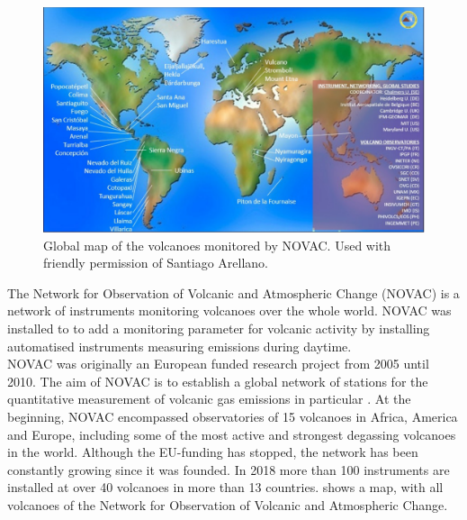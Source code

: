 


		\begin{figure}[h]
			\centering
			\includegraphics[width=0.8\linewidth]{Bilder/NOVAC2015}
			\caption{Global map of the volcanoes monitored by NOVAC. Used with friendly permission of Santiago Arellano.}
			\label{fig:novac2015}
		\end{figure}
		The Network for Observation of Volcanic and Atmospheric Change (NOVAC) is a network of instruments monitoring volcanoes over the whole world. 
		NOVAC was installed to to add a monitoring parameter for volcanic activity by installing automatised instruments measuring  emissions during daytime.\\
		NOVAC was originally an European funded research project from 2005 until 2010. The aim of NOVAC is to  establish  a  global  
		network  of  stations  for  the  quantitative  measurement  of  volcanic gas  emissions in particular . At the beginning, NOVAC encompassed observatories of 15 volcanoes in Africa, America and Europe, including some of the most active and strongest degassing volcanoes in the world. Although the EU-funding has stopped, the network has been constantly growing since it was founded. In 2018 more than 100 instruments are installed at over 40 volcanoes in more than 13 countries.
		 shows a map, with all volcanoes of the Network for Observation of Volcanic and Atmospheric Change.\\
		
